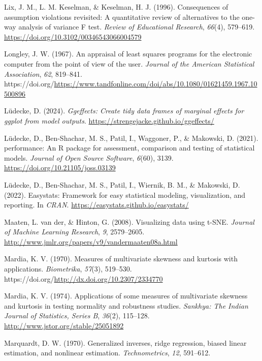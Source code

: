 \documentclass[
  letterpaper,
  10pt,
  krantz2]{krantz}
\newlength{\cslhangindent}
\newenvironment{CSLReferences}[2] %
 {\begin{list}{}{%
  \setlength{\itemindent}{0pt}
  \setlength{\leftmargin}{0pt}
  \setlength{\parsep}{0pt}
  \ifodd #1
   \setlength{\leftmargin}{\cslhangindent}
   \setlength{\itemindent}{-1\cslhangindent}
  \fi
  \setlength{\itemsep}{#2\baselineskip}}}
 {\end{list}}
\begin{document}
{\begin{CSLReferences}{1}{0}
Lix, J. M., L. M. Keselman, \& Keselman, H. J. (1996). Consequences of
assumption violations revisited: A quantitative review of alternatives
to the one-way analysis of variance {F} test. \emph{Review of
Educational Research}, \emph{66}(4), 579--619.
\url{https://doi.org/10.3102/00346543066004579}

Longley, J. W. (1967). An appraisal of least squares programs for the
electronic computer from the point of view of the user. \emph{Journal of
the American Statistical Association}, \emph{62}, 819--841.
https://doi.org/\url{https://www.tandfonline.com/doi/abs/10.1080/01621459.1967.10500896}

Lüdecke, D. (2024). \emph{Ggeffects: Create tidy data frames of marginal
effects for ggplot from model outputs}.
\url{https://strengejacke.github.io/ggeffects/}

Lüdecke, D., Ben-Shachar, M. S., Patil, I., Waggoner, P., \& Makowski,
D. (2021). {performance}: An {R} package for assessment, comparison and
testing of statistical models. \emph{Journal of Open Source Software},
\emph{6}(60), 3139. \url{https://doi.org/10.21105/joss.03139}

Lüdecke, D., Ben-Shachar, M. S., Patil, I., Wiernik, B. M., \& Makowski,
D. (2022). Easystats: Framework for easy statistical modeling,
visualization, and reporting. In \emph{CRAN}.
\url{https://easystats.github.io/easystats/}

Maaten, L. van der, \& Hinton, G. (2008). Visualizing data using
{t-SNE}. \emph{Journal of Machine Learning Research}, \emph{9},
2579--2605. \url{http://www.jmlr.org/papers/v9/vandermaaten08a.html}

Mardia, K. V. (1970). Measures of multivariate skewness and kurtosis
with applications. \emph{Biometrika}, \emph{57}(3), 519--530.
https://doi.org/\url{http://dx.doi.org/10.2307/2334770}

Mardia, K. V. (1974). Applications of some measures of multivariate
skewness and kurtosis in testing normality and robustness studies.
\emph{Sankhya: The Indian Journal of Statistics, Series B},
\emph{36}(2), 115--128. \url{http://www.jstor.org/stable/25051892}

Marquardt, D. W. (1970). Generalized inverses, ridge regression, biased
linear estimation, and nonlinear estimation. \emph{Technometrics},
\emph{12}, 591--612.


\end{CSLReferences}}
\end{document}
